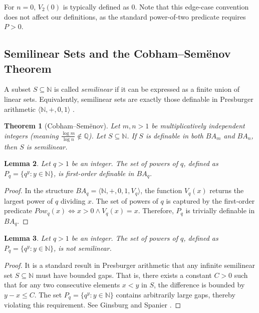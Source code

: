 \documentclass[11pt]{article}
\newtheorem{theorem}{Theorem}
\newtheorem{lemma}[theorem]{Lemma}
\begin{document}
For $n=0$, $V_2(0)$ is typically defined as 0. Note that this edge-case convention does not affect our definitions, as the standard power-of-two predicate requires $P > 0$. \\

\subsection{Semilinear Sets and the Cobham--Sem\"enov Theorem}

A subset $S \subseteq \mathbb{N}$ is called \textit{semilinear} if it can be expressed as a finite union of linear sets. Equivalently, semilinear sets are exactly those definable in Presburger arithmetic $\langle \mathbb{N}, +, 0, 1 \rangle$ \cite{Presburger}.

\begin{theorem}[Cobham--Sem\"enov]
Let $m, n > 1$ be multiplicatively independent integers (meaning $\frac{\log m}{\log n} \notin \mathbb{Q}$). Let $S \subseteq \mathbb{N}$. If $S$ is definable in both $BA_m$ and $BA_n$, then $S$ is semilinear. \cite{Cobham, Semenov}
\end{theorem}

\begin{lemma} \label{lem:pq_definable}
Let $q > 1$ be an integer. The set of powers of $q$, defined as $P_q = \{q^y : y \in \mathbb{N}\}$, is first-order definable in $BA_q$.
\end{lemma}

\begin{proof}
In the structure $BA_q = \langle \mathbb{N}, +, 0, 1, V_q \rangle$, the function $V_q(x)$ returns the largest power of $q$ dividing $x$. The set of powers of $q$ is captured by the first-order predicate $Pow_q(x) \iff x > 0 \land V_q(x) = x$. Therefore, $P_q$ is trivially definable in $BA_q$.
\end{proof}

\begin{lemma} \label{lem:non-semilinear}
Let $q > 1$ be an integer. The set of powers of $q$, defined as $P_q = \{q^y : y \in \mathbb{N}\}$, is not semilinear.
\end{lemma}

\begin{proof}
It is a standard result in Presburger arithmetic that any infinite semilinear set $S \subseteq \mathbb{N}$ must have bounded gaps. That is, there exists a constant $C > 0$ such that for any two consecutive elements $x < y$ in $S$, the difference is bounded by $y - x \le C$. The set $P_q = \{q^y : y \in \mathbb{N}\}$ contains arbitrarily large gaps, thereby violating this requirement. See Ginsburg and Spanier \cite{Ginsburg}.
\end{proof}
\end{document}
